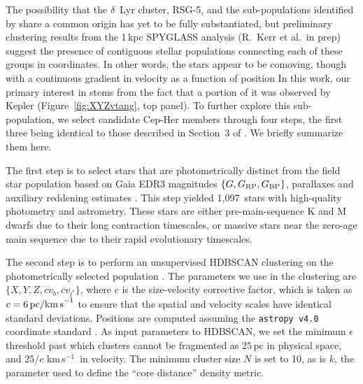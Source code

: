 \documentclass[12pt,twocolumn,tighten,linenumbers]{aastex63}
\newcommand{\npms}{1{,}097} %
\newcommand{\kms}{\,km\,s$^{-1}$}
\begin{document}
The possibility that the $\delta$~Lyr cluster, RSG-5, and the
sub-populations identified by \citet{Kerr2021} share a common origin
has yet to be fully substantiated, but preliminary clustering results
from the 1\,kpc SPYGLASS analysis (R.~Kerr et al.\ in prep) suggest
the presence of contiguous stellar populations connecting each of
these groups in  coordinates.  In other words, the stars
appear to be comoving, though with a continuous gradient in velocity
as a function of position
In this work, our primary interest in  stems
from the fact that a portion of it was observed by Kepler
(Figure~\ref{fig:XYZvtang}, top panel).  To further explore this
sub-population, we select candidate Cep-Her members through four
steps, the first three being identical to those described in Section~3
of \citet{Kerr2021}.  We briefly summarize them here.

The first step is to select stars that are photometrically distinct
from the field star population based on Gaia EDR3 magnitudes $\{G,
G_{\rm RP}, G_{\rm BP}\}$, parallaxes and auxiliary reddening
estimates \citep{lallement_gaia-2mass_2019}.  This step yielded \npms\
stars with high-quality photometry and astrometry.  These stars are
either pre-main-sequence K and M dwarfs due to their long contraction
timescales, or massive stars near the zero-age main sequence due to
their rapid evolutionary timescales.

The second step is to perform an unsupervised HDBSCAN clustering on
the photometrically selected population
\citep{campello_hierarchical_2015,mcinnes_hdbscan_2017}.  The
parameters we use in the clustering are $\{ X, Y, Z, c v_b, c v_{l^*}
\} $, where $c$ is
the size-velocity corrective factor, which is taken as $c=6\,{\rm pc /
km\,s}^{-1}$ to ensure that the spatial and velocity scales have
identical standard deviations.  Positions are computed assuming the
\texttt{astropy v4.0} coordinate standard
\citep{astropy_2018}. %
As input
parameters to HDBSCAN, we set the minimum $\epsilon$ threshold past
which clusters cannot be fragmented as $25$\,pc in physical space, and
$25/c$\,\kms\ in velocity.  The minimum cluster size $N$ is set to 10, as
is $k$, the parameter used to define the ``core distance'' density
metric. 
\end{document}

